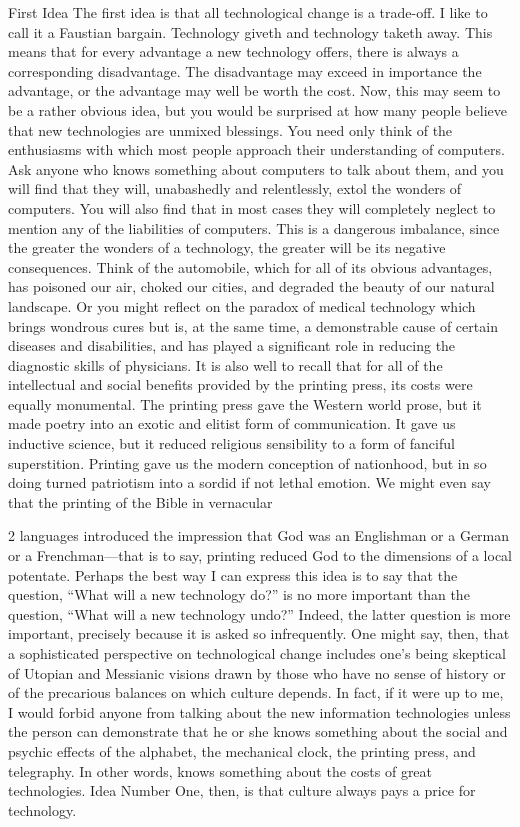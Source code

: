 First Idea
The first idea is that all technological change is a trade-off. I like to call it a Faustian bargain. Technology
giveth and technology taketh away. This means that for every advantage a new technology offers, there is
always a corresponding disadvantage. The disadvantage may exceed in importance the advantage, or the
advantage may well be worth the cost. Now, this may seem to be a rather obvious idea, but you would be
surprised at how many people believe that new technologies are unmixed blessings. You need only think of
the enthusiasms with which most people approach their understanding of computers. Ask anyone who
knows something about computers to talk about them, and you will find that they will, unabashedly and
relentlessly, extol the wonders of computers. You will also find that in most cases they will completely
neglect to mention any of the liabilities of computers. This is a dangerous imbalance, since the greater the
wonders of a technology, the greater will be its negative consequences.
Think of the automobile, which for all of its obvious advantages, has poisoned our air, choked our cities,
and degraded the beauty of our natural landscape. Or you might reflect on the paradox of medical
technology which brings wondrous cures but is, at the same time, a demonstrable cause of certain diseases
and disabilities, and has played a significant role in reducing the diagnostic skills of physicians. It is also
well to recall that for all of the intellectual and social benefits provided by the printing press, its costs were
equally monumental. The printing press gave the Western world prose, but it made poetry into an exotic
and elitist form of communication. It gave us inductive science, but it reduced religious sensibility to a
form of fanciful superstition. Printing gave us the modern conception of nationhood, but in so doing turned
patriotism into a sordid if not lethal emotion. We might even say that the printing of the Bible in vernacular 

2
languages introduced the impression that God was an Englishman or a German or a Frenchman—that is to
say, printing reduced God to the dimensions of a local potentate.
Perhaps the best way I can express this idea is to say that the question, “What will a new technology do?” is
no more important than the question, “What will a new technology undo?” Indeed, the latter question is
more important, precisely because it is asked so infrequently. One might say, then, that a sophisticated
perspective on technological change includes one’s being skeptical of Utopian and Messianic visions drawn
by those who have no sense of history or of the precarious balances on which culture depends. In fact, if it
were up to me, I would forbid anyone from talking about the new information technologies unless the
person can demonstrate that he or she knows something about the social and psychic effects of the alphabet,
the mechanical clock, the printing press, and telegraphy. In other words, knows something about the costs
of great technologies.
Idea Number One, then, is that culture always pays a price for technology.


